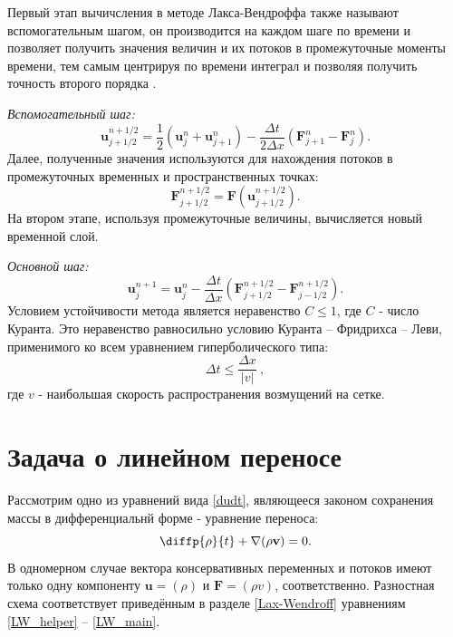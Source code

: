 \documentclass[a4paper]{article}
\begin{document}
	Первый этап вычичсления в методе Лакса-Вендроффа также называют вспомогательным шагом, он производится на каждом шаге по времени и позволяет получить значения величин и их потоков в промежуточные моменты времени, тем самым центрируя по времени интеграл и позволяя получить точность второго порядка \cite{Potter}. 
	
	\textit{Вспомогательный шаг:}
	\begin{equation}\label{LW_helper}
	\mathbf{u}_{j+1/2}^{n+1/2} = \frac{1}{2} \left(\mathbf{u}_{j}^{n} + \mathbf{u}_{j+1}^{n}\right)
	- \frac{\Delta t}{2 \Delta x}
	\left(\mathbf{F}_{j+1}^{n} - \mathbf{F}_{j}^{n}\right) .
	\end{equation}
	Далее, полученные значения используются для нахождения потоков в промежуточных временных и пространственных точках:
	\begin{equation}\label{LW_flow}
	\mathbf{F}_{j+1/2}^{n+1/2} = \mathbf{F} \left( \mathbf{u}_{j+1/2}^{n+1/2} \right).
	\end{equation}
	На втором этапе, используя промежуточные величины, вычисляется новый временной слой.
	
	\textit{Основной шаг:}
	\begin{equation}\label{LW_main}
	\mathbf{u}_{j}^{n+1} = \mathbf{u}_{j}^{n} - \frac{\Delta t}{\Delta x} \left(
	\mathbf{F}_{j+1/2}^{n+1/2} - \mathbf{F}_{j-1/2}^{n+1/2}				 \right) .
	\end{equation}
	Условием устойчивости метода является неравенство $C \leqslant 1$, где $C$ - число Куранта. Это неравенство равносильно условию Куранта -- Фридрихса -- Леви, применимого ко всем уравнением гиперболического типа: %
	\begin{equation}
	\Delta t \leqslant \dfrac{\Delta x}{|v|} \:,
	\end{equation}
	где $v$ - наибольшая скорость распространения возмущений на сетке.
		
	\section{Задача о линейном переносе}\label{transfer}
	Рассмотрим одно из уравнений вида \eqref{dudt}, являющееся законом сохранения массы в дифференциальнй форме - уравнение переноса:
	\begin{equation}\label{eqTransfer}
		\diffp{\rho}{t} + \nabla ( \rho \mathbf{v} ) = 0 .
	\end{equation}
	В одномерном случае вектора консервативных переменных и потоков имеют только одну компоненту $\mathbf{u} = (\rho)$ и $\mathbf{F} = (\rho v)$, соответственно. Разностная схема соответствует приведённым в разделе \ref{Lax-Wendroff} уравнениям \eqref{LW_helper} -- \eqref{LW_main}.
	
\end{document}
